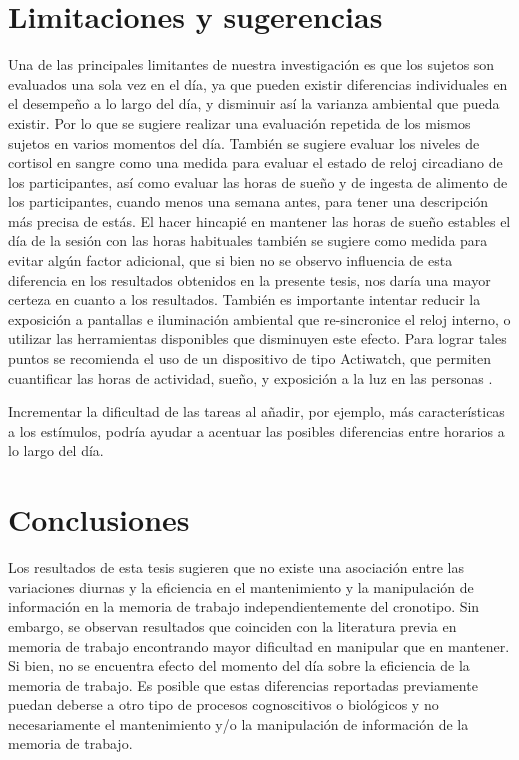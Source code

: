 \documentclass[12pt,letterpaper,final]{article}
\let\cite\cite %
\begin{document}
\section{Limitaciones y sugerencias}
Una de las principales limitantes de nuestra investigación es que los sujetos son evaluados una sola vez en el día, ya que pueden existir diferencias individuales en el desempeño a lo largo del día, y disminuir así la varianza ambiental que pueda existir. Por lo que se sugiere realizar una evaluación repetida de los mismos sujetos en varios momentos del día. También se sugiere evaluar los niveles de cortisol en sangre como una medida para evaluar el estado de reloj circadiano de los participantes, así como evaluar las horas de sueño y de ingesta de alimento de los participantes, cuando menos una semana antes, para tener una descripción más precisa de estás. El hacer hincapié en mantener las horas de sueño estables el día de la sesión con las horas habituales también se sugiere como medida para evitar algún factor adicional, que si bien no se observo influencia de esta diferencia en los resultados obtenidos en la presente tesis, nos daría una mayor certeza en cuanto a los resultados.   También es importante intentar reducir la exposición a pantallas e iluminación ambiental que re-sincronice el reloj interno, o utilizar las herramientas disponibles que disminuyen este efecto.  Para lograr tales puntos se recomienda el uso de un dispositivo de tipo Actiwatch, que permiten cuantificar las horas de actividad, sueño, y exposición a la luz en las personas \cite{Figueiro2013}.

Incrementar la dificultad de las tareas al añadir, por ejemplo, más características a los estímulos, podría ayudar a acentuar las posibles diferencias entre horarios a lo largo del día.
 
\section{Conclusiones}


Los resultados de esta tesis sugieren que no existe una asociación entre las variaciones diurnas y la eficiencia en el mantenimiento y la manipulación de información en la memoria de trabajo independientemente del cronotipo. Sin embargo, se observan resultados que coinciden con la literatura previa en memoria de trabajo encontrando mayor dificultad en manipular que en mantener. Si bien, no se encuentra efecto del momento del día sobre la eficiencia de la memoria de trabajo. Es posible que estas diferencias reportadas previamente puedan deberse a otro tipo de procesos cognoscitivos  o biológicos y no necesariamente el mantenimiento y/o la manipulación de información de la memoria de trabajo.

   




\renewcommand{\baselinestretch}{1}



\end{document}
